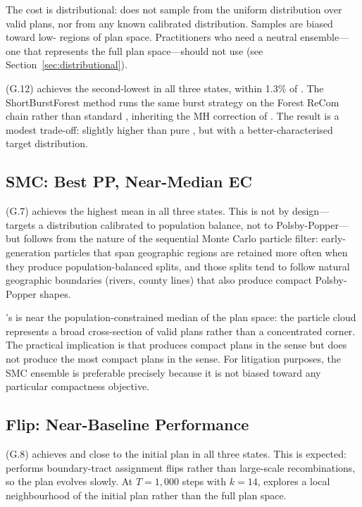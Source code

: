 The cost is distributional: \sburst{} does not sample from the uniform
distribution over valid plans, nor from any known calibrated distribution.
Samples are biased toward low-\ec{} regions of plan space.
Practitioners who need a neutral ensemble---one that represents the full
plan space---should not use \sburst{} (see Section~\ref{sec:distributional}).

\sburstf{} (G.12) achieves the second-lowest \ec{} in all three states,
within 1.3\% of \sburst{}.
The ShortBurstForest method runs the same burst strategy on the Forest
ReCom chain rather than standard \recom{}, inheriting the MH correction
of \fr{}.
The result is a modest trade-off: slightly higher \ec{} than pure \sburst{},
but with a better-characterised target distribution.

\subsection{SMC: Best PP, Near-Median EC}

\smc{} (G.7) achieves the highest mean \pp{} in all three states.
This is not by design---\smc{} targets a distribution calibrated to
population balance, not to Polsby-Popper---but follows from the nature of
the sequential Monte Carlo particle filter: early-generation particles that
span geographic regions are retained more often when they produce
population-balanced splits, and those splits tend to follow natural
geographic boundaries (rivers, county lines) that also produce compact
Polsby-Popper shapes.

\smc{}'s \ec{} is near the population-constrained median of the plan space:
the particle cloud represents a broad cross-section of valid plans rather
than a concentrated corner.
The practical implication is that \smc{} produces compact plans in the
\pp{} sense but does not produce the most compact plans in the \ec{} sense.
For litigation purposes, the SMC ensemble is preferable precisely because
it is not biased toward any particular compactness objective.

\subsection{Flip: Near-Baseline Performance}

\flip{} (G.8) achieves \ec{} and \pp{} close to the initial plan in all
three states.
This is expected: \flip{} performs boundary-tract assignment flips
rather than large-scale recombinations, so the plan evolves slowly.
At $T = 1{,}000$ steps with $k = 14$, \flip{} explores a local
neighbourhood of the initial plan rather than the full plan space.

